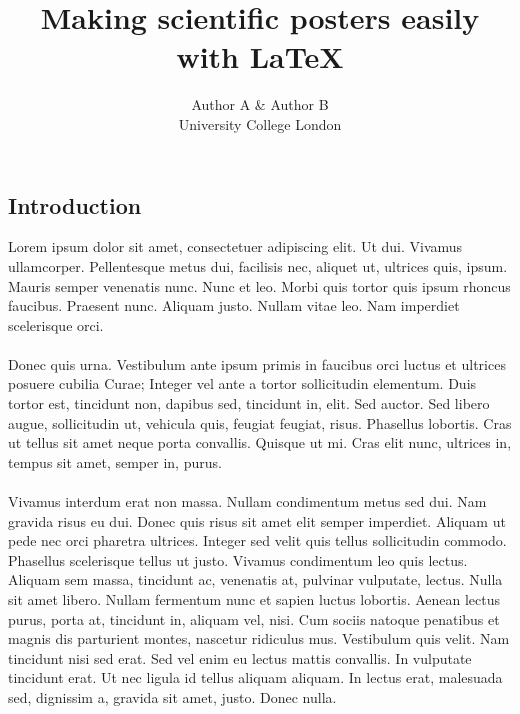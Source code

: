 \documentclass[a0,final]{a0poster}
\title{Making scientific posters easily with \LaTeX}
\author{Author A \& Author B\\
University College London}
\begin{document}
\hspace{-3cm}								%
\colorbox{boxcol}{							%
\begin{minipage}{1189mm}					%
\maketitle
\end{minipage}}
\vspace{1cm}

\begin{multicols}{3}							%
\raggedcolumns							%

\section*{Introduction}
Lorem ipsum dolor sit amet, consectetuer adipiscing elit. Ut dui. Vivamus ullamcorper. Pellentesque metus dui, facilisis nec, aliquet ut, ultrices quis, ipsum. Mauris semper venenatis nunc. Nunc et leo. Morbi quis tortor quis ipsum rhoncus faucibus. Praesent nunc. Aliquam justo. Nullam vitae leo. Nam imperdiet scelerisque orci.\\
\\
Donec quis urna. Vestibulum ante ipsum primis in faucibus orci luctus et ultrices posuere cubilia Curae; Integer vel ante a tortor sollicitudin elementum. Duis tortor est, tincidunt non, dapibus sed, tincidunt in, elit. Sed auctor. Sed libero augue, sollicitudin ut, vehicula quis, feugiat feugiat, risus. Phasellus lobortis. Cras ut tellus sit amet neque porta convallis. Quisque ut mi. Cras elit nunc, ultrices in, tempus sit amet, semper in, purus.\\
\\
Vivamus interdum erat non massa. Nullam condimentum metus sed dui. Nam gravida risus eu dui. Donec quis risus sit amet elit semper imperdiet. Aliquam ut pede nec orci pharetra ultrices. Integer sed velit quis tellus sollicitudin commodo. Phasellus scelerisque tellus ut justo. Vivamus condimentum leo quis lectus. Aliquam sem massa, tincidunt ac, venenatis at, pulvinar vulputate, lectus. Nulla sit amet libero. Nullam fermentum nunc et sapien luctus lobortis. Aenean lectus purus, porta at, tincidunt in, aliquam vel, nisi. Cum sociis natoque penatibus et magnis dis parturient montes, nascetur ridiculus mus. Vestibulum quis velit. Nam tincidunt nisi sed erat. Sed vel enim eu lectus mattis convallis. In vulputate tincidunt erat. Ut nec ligula id tellus aliquam aliquam. In lectus erat, malesuada sed, dignissim a, gravida sit amet, justo. Donec nulla.



\end{multicols}
\end{document}
